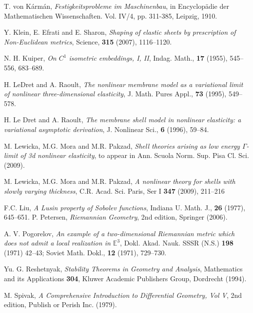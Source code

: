\documentclass[leqno,twoside, 11pt]{amsart}
\theoremstyle{plain}
\theoremstyle{definition}
\numberwithin{equation}{section}
\numberwithin{figure}{section}
\begin{document}
\begin{thebibliography}{9999}
 T. von K\'arm\'an, \textit{Festigkeitsprobleme im Maschinenbau}, 
in Encyclop\"adie der Mathematischen Wissenschaften. Vol. IV/4, pp. 311-385, Leipzig,
1910.

 Y. Klein, E. Efrati and E. Sharon,
\textit{Shaping of elastic sheets by prescription of Non-Euclidean metrics}, Science, 
{\bf 315} (2007), 1116--1120. 

 N. H. Kuiper, 
\textit{On $C^1$ isometric embeddings, I, II}, Indag. Math., {\bf 17} (1955), 
545--556, 683--689. 

 H. LeDret and A. Raoult, \textit{The nonlinear membrane model as 
a variational limit of nonlinear three-dimensional elasticity}, 
J. Math. Pures Appl., \textbf{73} (1995), 549--578.

 H. Le Dret and A. Raoult, 
\textit{The membrane shell model in nonlinear 
elasticity: a variational asymptotic derivation}, J. Nonlinear Sci., {\bf 6} 
(1996), 59--84.
                             
 M. Lewicka, M.G. Mora and M.R. Pakzad, \textit{Shell theories 
arising as low energy $\Gamma$-limit of 3d nonlinear elasticity},
to appear in Ann. Scuola Norm. Sup. Pisa Cl. Sci. (2009).

 M. Lewicka, M.G. Mora and M.R. Pakzad,
    \textit{A nonlinear theory for shells with slowly varying thickness}, 
C.R. Acad. Sci. Paris, Ser I {\bf 347} (2009), 211--216

 F.C. Liu, \textit{A Lusin property of Sobolev functions},
Indiana U. Math. J., {\bf 26}  (1977),  645--651.
 P. Petersen,
\textit{Riemannian Geometry}, 2nd edition, Springer (2006).

 A. V. Pogorelov, \textit{An example of a two-dimensional 
Riemannian metric which does not admit a local realization in $\mathbb E^3$}, 
Dokl. Akad. Nauk. SSSR (N.S.) {\bf 198} (1971) 42--43; Soviet Math. Dokl., 
{\bf 12} (1971), 729--730.

 Yu. G. Reshetnyak, \textit{Stability Theorems in Geometry 
and Analysis}, Mathematics and its Applications {\bf 304}, 
Kluwer Academic Publishers Group, Dordrecht (1994).

	

 

 M. Spivak, \textit{A Comprehensive Introduction to Differential 
Geometry, Vol V}, 2nd edition, Publish or Perish Inc. (1979).

\end{thebibliography}
\end{document}
